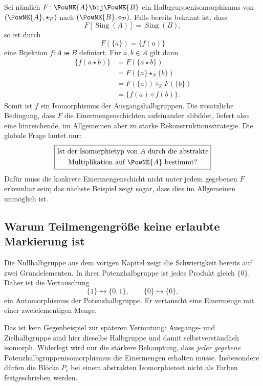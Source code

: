 \documentclass[main.tex]{subfiles}
\begin{document}
Sei nämlich \(F\colon\PowNE{A}\bij\PowNE{B}\) ein
Halbgruppenisomorphismus von
\((\PowNE{A},\star_{\mathcal P})\) nach
\((\PowNE{B},\diamond_{\mathcal P})\).  Falls bereits bekannt ist, dass
\[
  F[\operatorname{Sing}(A)]=\operatorname{Sing}(B),
\]
so ist durch
\[
  F(\{a\})=\{f(a)\}
\]
eine Bijektion \(f\colon A\bij B\) definiert.  Für \(a,b\in A\) gilt dann
\[
\begin{aligned}
  \{f(a\star b)\}
  &=F(\{a\star b\})\\
  &=F(\{a\}\star_{\mathcal P}\{b\})\\
  &=F(\{a\})\diamond_{\mathcal P}F(\{b\})\\
  &=\{f(a)\diamond f(b)\}.
\end{aligned}
\]
Somit ist \(f\) ein Isomorphismus der Ausgangshalbgruppen.  Die zusätzliche
Bedingung, dass \(F\) die Einermengenschichten aufeinander abbildet, liefert
also eine hinreichende, im Allgemeinen aber zu starke
Rekonstruktionsstrategie.  Die globale Frage lautet nur:
\[
\boxed{
\begin{gathered}
\text{Ist der Isomorphietyp von }A\text{ durch die abstrakte}\\
\text{Multiplikation auf }\PowNE{A}\text{ bestimmt?}
\end{gathered}}
\]
Dafür muss die konkrete Einermengenschicht nicht unter jedem gegebenen \(F\)
erkennbar sein; das nächste Beispiel zeigt sogar, dass dies im Allgemeinen
unmöglich ist.

\subsection{Warum Teilmengengröße keine erlaubte Markierung ist}

Die Nullhalbgruppe aus dem vorigen Kapitel zeigt die Schwierigkeit bereits
auf zwei Grundelementen.  In ihrer Potenzhalbgruppe ist jedes Produkt gleich
\(\{0\}\).  Daher ist die Vertauschung
\[
  \{1\}\longleftrightarrow\{0,1\},
  \qquad
  \{0\}\longmapsto\{0\},
\]
ein Automorphismus der Potenzhalbgruppe.  Er vertauscht eine Einermenge mit
einer zweielementigen Menge.

Das ist kein Gegenbeispiel zur späteren Vermutung: Ausgangs- und
Zielhalbgruppe sind hier dieselbe Halbgruppe und damit selbstverständlich
isomorph.  Widerlegt wird nur die stärkere Behauptung, dass
\emph{jeder gegebene} Potenzhalbgruppenisomorphismus die Einermengen erhalten
müsse.  Insbesondere dürfen die Blöcke \(P_r\) bei einem abstrakten
Isomorphietest nicht als Farben festgeschrieben werden.
\end{document}
